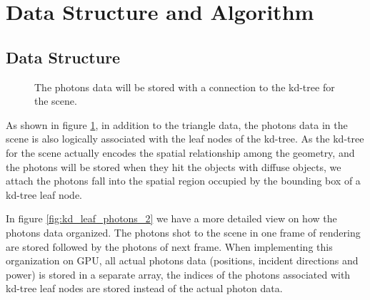 \section{Data Structure and Algorithm}

\subsection{Data Structure}

\begin{figure}
    \centering
    \renewcommand{\thefigure}{\thechapter.\arabic{figure}}
    \caption[Association of kd-tree and photons data]{The photons data will be stored with a connection to the kd-tree for the scene. }
    \label{fig:kd_leaf_photons}
\end{figure}

As shown in figure \ref{fig:kd_leaf_photons}, in addition to the triangle data, the photons data in the scene is also logically associated with the leaf nodes of the kd-tree. As the kd-tree for the scene actually encodes the spatial relationship among the geometry, and the photons will be stored when they hit the objects with diffuse objects, we attach the photons fall into the spatial region occupied by the bounding box of a kd-tree leaf node.


In figure \ref{fig:kd_leaf_photons_2} we have a more detailed view on how the photons data organized. The photons shot to the scene in one frame of rendering are stored followed by the photons of next frame. When implementing this organization on GPU, all actual photons data (positions, incident directions and power) is stored in a separate array, the indices of the photons associated with kd-tree leaf nodes are stored instead of the actual photon data.

